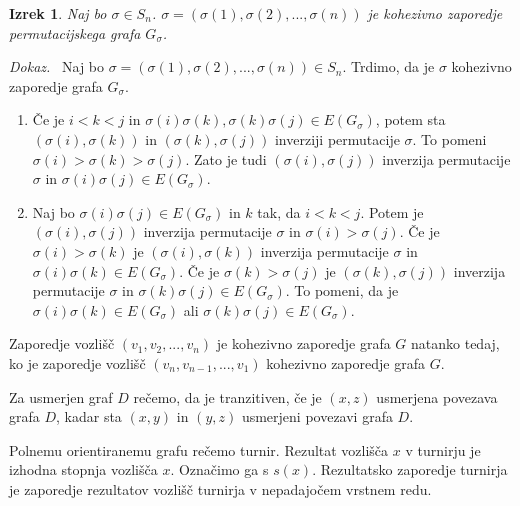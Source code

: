 \documentclass[a4paper, 12pt]{book}
\newtheorem{izrek}{Izrek}[chapter]
\newenvironment{dokaz}{\emph{Dokaz.}\ }{\hspace{\fill}{$\Box$}}
\begin{document}
\begin{izrek}
\label{izrek_sigma_kohezivno_zaporedje}
    Naj bo $\sigma \in S_n$. $\sigma = (\sigma(1), \sigma(2), ..., \sigma(n))$ je kohezivno zaporedje permutacijskega grafa $G_{\sigma}$.
\end{izrek}
\begin{dokaz}
    Naj bo $\sigma = (\sigma(1), \sigma(2), ..., \sigma(n)) \in S_n$. Trdimo, da je $\sigma$ kohezivno zaporedje grafa $G_{\sigma}$. 
    \begin{enumerate}[label=(\alph*)]
        \item Če je $i < k < j$ in $\sigma(i)\sigma(k), \sigma(k)\sigma(j) \in E(G_{\sigma})$, potem sta $(\sigma(i),\sigma(k))$ in $(\sigma(k),\sigma(j))$ inverziji permutacije $\sigma$. To pomeni $\sigma(i) > \sigma(k) > \sigma(j)$. Zato je tudi $(\sigma(i),\sigma(j))$ inverzija permutacije $\sigma$ in $\sigma(i)\sigma(j) \in E(G_{\sigma})$.        

        \item Naj bo $\sigma(i)\sigma(j) \in E(G_{\sigma})$ in $k$ tak, da $i < k < j$. Potem je $(\sigma(i),\sigma(j))$ inverzija permutacije $\sigma$ in $\sigma(i) > \sigma(j)$. Če je $\sigma(i) > \sigma(k)$ je $(\sigma(i),\sigma(k))$ inverzija permutacije $\sigma$ in $\sigma(i)\sigma(k) \in E(G_{\sigma})$. Če je $\sigma(k) > \sigma(j)$ je $(\sigma(k), \sigma(j))$ inverzija permutacije $\sigma$ in $\sigma(k)\sigma(j) \in E(G_{\sigma})$. To pomeni, da je 
        $\sigma(i)\sigma(k) \in E(G_{\sigma})$ ali $\sigma(k)\sigma(j) \in E(G_{\sigma})$.
    \end{enumerate}
\end{dokaz}

Zaporedje vozlišč $(v_1, v_2, ..., v_n)$ je kohezivno zaporedje grafa $G$ natanko tedaj, ko je zaporedje vozlišč $(v_n, v_{n-1}, ..., v_1)$ kohezivno zaporedje grafa $G$.

Za usmerjen graf $D$ rečemo, da je tranzitiven, če je $(x, z)$ usmerjena povezava grafa $D$, kadar sta $(x, y)$ in $(y, z)$ usmerjeni povezavi grafa $D$. 

Polnemu orientiranemu grafu rečemo turnir. Rezultat vozlišča $x$ v turnirju je izhodna stopnja vozlišča $x$. Označimo ga s $s(x)$. Rezultatsko zaporedje turnirja je zaporedje rezultatov vozlišč turnirja v nepadajočem vrstnem redu.
\end{document}
